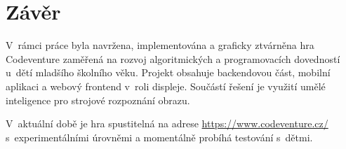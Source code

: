 \chapter{Závěr}

V~rámci práce byla navržena, implementována a graficky ztvárněna hra Codeventure zaměřená na rozvoj algoritmických a programovacích dovedností u~dětí mladšího školního věku. Projekt obsahuje backendovou část, mobilní aplikaci a webový frontend v~roli displeje. Součástí řešení je využití umělé inteligence pro strojové rozpoznání obrazu.\par
V~aktuální době je hra spustitelná na adrese \url{https://www.codeventure.cz/} s~experimentálními úrovněmi a momentálně probíhá testování s~dětmi.
